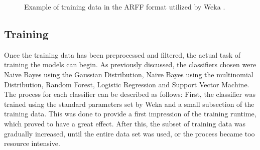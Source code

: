  
\begin{figure}
    \centering
{}
    \caption{Example of training data in the ARFF format utilized by Weka \cite{weka}.}
    \label{fig:arff_train}
\end{figure}


\subsection{Training}

Once the training data has been preprocessed and filtered, the actual task of training the models can begin. As previously discussed, the classifiers chosen were Naive Bayes using the Gaussian Distribution, Naive Bayes using the multinomial Distribution, Random Forest, Logistic Regression and Support Vector Machine. The process for each classifier can be described as follows: First, the classifier was trained using the standard parameters set by Weka and a small subsection of the training data. This was done to provide a first impression of the training runtime, which proved to have a great effect. After this, the subset of training data was gradually increased, until the entire data set was used, or the process became too resource intensive. 

